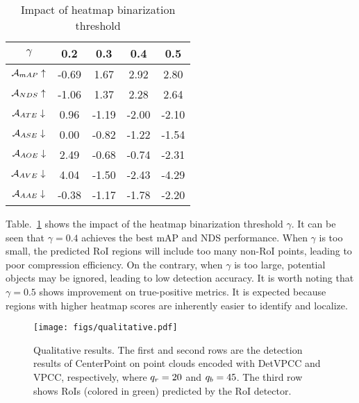 \begin{table}[ht]
\vspace{-0.4cm}
\centering
\renewcommand{\arraystretch}{\TABVSPACE} %
\setlength{\tabcolsep}{12pt} %
\caption{Impact of heatmap binarization threshold}
\begin{tabular}{c|c|c|c|c}
\hline
$\gamma$ & 0.2 & 0.3 & 0.4 & 0.5 \\
\hline
        $\mathcal{A}_{mAP}\uparrow$ & -0.69 & 1.67 & 2.92 & 2.80 \\ 
        $\mathcal{A}_{NDS}\uparrow$ & -1.06 & 1.37 & 2.28 & 2.64 \\ 
        $\mathcal{A}_{ATE}\downarrow$ & 0.96 & -1.19 & -2.00 & -2.10 \\ 
        $\mathcal{A}_{ASE}\downarrow$ & 0.00 & -0.82 & -1.22 & -1.54 \\ 
        $\mathcal{A}_{AOE}\downarrow$ & 2.49 & -0.68 & -0.74 & -2.31 \\ 
        $\mathcal{A}_{AVE}\downarrow$ & 4.04 & -1.50 & -2.43 & -4.29 \\ 
        $\mathcal{A}_{AAE}\downarrow$ & -0.38 & -1.17 & -1.78 & -2.20 \\ 
\hline
\end{tabular}
\label{tab-abla-heatmap-thrd}
\vspace{-0.2cm}
\end{table}


Table.~\ref{tab-abla-heatmap-thrd} shows the impact of the heatmap binarization threshold $\gamma$. It can be seen that $\gamma=0.4$ achieves the best mAP and NDS performance. When $\gamma$ is too small, the predicted RoI regions will include too many non-RoI points, leading to poor compression efficiency. On the contrary, when $\gamma$ is too large, potential objects may be ignored, leading to low detection accuracy.
It is worth noting that $\gamma=0.5$ shows improvement on true-positive metrics. It is expected because regions with higher heatmap scores are inherently easier to identify and localize.


\begin{figure*}[t!]
\setlength{\abovecaptionskip}{0.2cm}
\setlength{\belowcaptionskip}{-0.2cm}
  \centering
    \texttt{[image: figs/qualitative.pdf]}
  \caption[]{Qualitative results. The first and second rows are the detection results of CenterPoint on point clouds encoded with DetVPCC and VPCC, respectively, where ${q_{r}}=20$ and ${q_{b}}=45$. The third row shows RoIs (colored in green) predicted by the RoI detector.}
  \label{fig-qualitative}
\vspace{-0.2cm}
\end{figure*}


